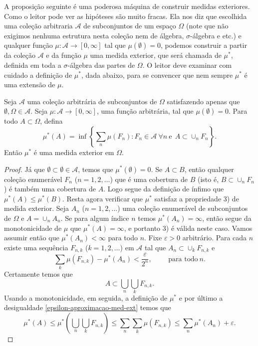 A proposição seguinte é uma poderosa máquina de construir medidas exteriores.
Como o leitor pode ver as hipóteses são muito fracas. Ela nos diz que
escolhida uma coleção arbitraria $\mathcal{A}$ de subconjuntos
de um espaço $\Omega$ 
(note que não exigimos nenhuma estrutura nesta coleção nem de álgebra, $\sigma$-álgebra e etc.)
e qualquer função $\mu:\mathcal{A}\to [0,\infty]$  
tal que $\mu(\emptyset)=0$, podemos construir a partir da coleção $\mathcal{A}$ e
da função $\mu$ uma medida exterior, que será chamada de $\mu^{*}$,
definida em toda a $\sigma$-álgebra das partes de $\Omega$.
O leitor deve examinar com cuidado a definição de
$\mu^{*}$, dada abaixo, para se convencer que nem sempre $\mu^{*}$ 
é uma extensão de $\mu$. 

 
\begin{proposicao}\label{prop-med-ext}
Seja $\mathcal{A}$ uma coleção arbitrária de subconjuntos de $\Omega$ satisfazendo
apenas que $\emptyset,\Omega\in \mathcal{A}$. Seja $\mu:\mathcal{A}\to [0,\infty]$,
uma função arbitrária, tal que $\mu(\emptyset)=0$.
Para todo $A\subset \Omega$, defina
\begin{equation}\label{def-medida-exterior}
\mu^{*}(A)= 
\inf \left\{
	\sum_{n}\mu(F_n): F_n\in \mathcal{A} \ \forall n\ \mathrm{e}
	\ \ A\subset \cup_{n} F_n
\right\}.
\end{equation}
Então $\mu^{*}$ é uma medida exterior em $\Omega$.
\end{proposicao}



\begin{proof}
Já que $\emptyset\subset \emptyset \in \mathcal{A}$, temos que $\mu^{*}(\emptyset)=0$.
Se $A\subset B$, então qualquer coleção enumerável $F_n$ ($n=1,2,\ldots$) que é uma 
cobertura de $B$ (isto é, $B\subset \cup_n F_n$) é também uma cobertura de $A$.
Logo segue da definição de ínfimo que $\mu^{*}(A)\leq \mu^{*}(B)$.
Resta agora verificar que $\mu^{*}$ satisfaz a propriedade 3) de medida exterior.
Seja $A_n$ ($n=1,2,\ldots$) uma coleção enumerável de subconjuntos de $\Omega$
e $A=\cup_n A_n$. Se para algum índice $n$ temos $\mu^{*}(A_n)=\infty$,
então segue da monotonicidade de $\mu$ que $\mu^{*}(A)=\infty$, e portanto 
3) é válida neste caso. Vamos assumir então que $\mu^{*}(A_n)<\infty$ 
para todo $n$. Fixe $\varepsilon>0$ arbitrário. Para cada $n$ existe
uma sequência $F_{n,k}$ ($k=1,2,\ldots$) em $\mathcal{A}$ tal que 
$A_n\subset \cup _k F_{n,k}$ e 
\begin{equation}\label{epsilon-aproximacao-med-ext}
\sum_k \mu(F_{n,k}) -\mu^{*}(A_n) < \frac{\varepsilon}{2^n},
\qquad
\text{ para todo}\ n.
\end{equation}
Certamente temos que 
$$
A\subset \bigcup_{n}\bigcup_{k} F_{n,k}.
$$
Usando a monotonicidade, em seguida, a definição de $\mu^{*}$ e por 
último a desigualdade \eqref{epsilon-aproximacao-med-ext} temos que
$$
\mu^{*}(A)
\leq 
\mu^{*}\left( \bigcup_{n}\bigcup_{k} F_{n,k} \right)
\leq
\sum_{n}\sum_{k} \mu(F_{n,k})
\leq \sum_{n}\mu^{*}(A_n) +\varepsilon.
$$
\end{proof}
 
